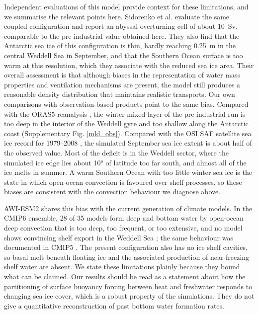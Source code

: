 \documentclass[pdflatex,sn-nature]{sn-jnl}
\begin{document}
Independent evaluations of this model provide context for these limitations, and we summarise the relevant points here. Sidorenko et al. \cite{sidorenko2019evaluation} evaluate the same coupled configuration and report an abyssal overturning cell of about 10~Sv, comparable to the pre-industrial value obtained here. They also find that the Antarctic sea ice of this configuration is thin, hardly reaching 0.25~m in the central Weddell Sea in September, and that the Southern Ocean surface is too warm at this resolution, which they associate with the reduced sea ice area. Their overall assessment is that although biases in the representation of water mass properties and ventilation mechanisms are present, the model still produces a reasonable density distribution that maintains realistic transports. Our own comparisons with observation-based products point to the same bias. Compared with the ORAS5 reanalysis \cite{Zuo2019}, the winter mixed layer of the pre-industrial run is too deep in the interior of the Weddell gyre and too shallow along the Antarctic coast (Supplementary Fig. \ref{mld_obs}). Compared with the OSI SAF satellite sea ice record for 1979--2008 \cite{OSISAF2022}, the simulated September sea ice extent is about half of the observed value. Most of the deficit is in the Weddell sector, where the simulated ice edge lies about 10° of latitude too far south, and almost all of the ice melts in summer. A warm Southern Ocean with too little winter sea ice is the state in which open-ocean convection is favoured over shelf processes, so these biases are consistent with the convection behaviour we diagnose above.

AWI-ESM2 shares this bias with the current generation of climate models. In the CMIP6 ensemble, 28 of 35 models form deep and bottom water by open-ocean deep convection that is too deep, too frequent, or too extensive, and no model shows convincing shelf export in the Weddell Sea \cite{Heuze2021}; the same behaviour was documented in CMIP5 \cite{Heuze2013}. The present configuration also has no ice shelf cavities, so basal melt beneath floating ice and the associated production of near-freezing shelf water are absent. We state these limitations plainly because they bound what can be claimed. Our results should be read as a statement about how the partitioning of surface buoyancy forcing between heat and freshwater responds to changing sea ice cover, which is a robust property of the simulations. They do not give a quantitative reconstruction of past bottom water formation rates.
\end{document}
